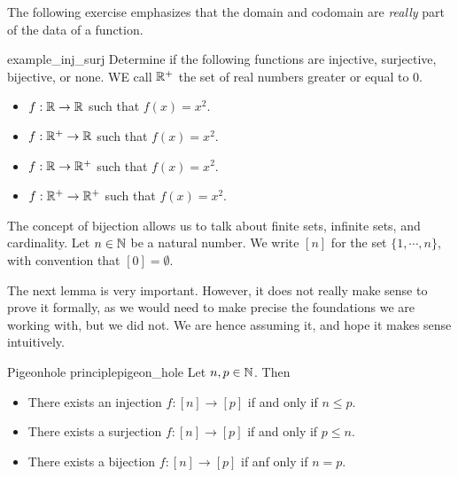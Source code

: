 The following exercise emphasizes that the domain and codomain are \textit{really} part of the data of a function.
\begin{cex}{}{example_inj_surj}
    Determine if the following functions are injective, surjective, bijective, or none. WE call \( \mathbb{R}^+ \) the set of real numbers greater or equal to \( 0 \).
    \begin{itemize}
        \item \( f : \mathbb{R} \to \mathbb{R} \) such that \( f(x) = x^2 \).
        \item \( f : \mathbb{R}^+ \to \mathbb{R} \) such that \( f(x) = x^2 \).
        \item \( f : \mathbb{R} \to \mathbb{R}^+ \) such that \( f(x) = x^2 \).
        \item \( f : \mathbb{R}^+ \to \mathbb{R}^+ \) such that \( f(x) = x^2 \).
    \end{itemize}
\end{cex}


The concept of bijection allows us to talk about finite sets, infinite sets, and cardinality. Let \( n \in \mathbb{N} \) be a natural number. We write \( [n] \) for the set \( \{ 1, \cdots, n \} \), with convention that \( [0] = \emptyset \).

The next lemma is very important. However, it does not really make sense to prove it formally, as we would need to make precise the foundations we are working with, but we did not. We are hence assuming it, and hope it makes sense intuitively.
\begin{clem}{Pigeonhole principle}{pigeon_hole}
    Let \( n, p \in \mathbb{N} \). Then
    \begin{itemize}
        \item There exists an injection \( f : [n] \to [p] \) if and only if \( n \le p \).
        \item There exists a surjection \( f : [n] \to [p] \) if and only if \( p \le n \).
        \item There exists a bijection \( f : [n] \to [p] \) if anf only if \( n = p \).
    \end{itemize}
\end{clem}

